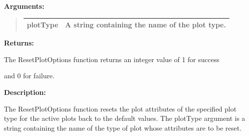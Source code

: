 \documentclass[letterpaper,10pt,english]{sphinxmanual}
\begin{document}
\begin{DUlineblock}{0em}
\item[] 
\item[] \textbf{Arguments:}
\end{DUlineblock}
\begin{quote}

\begin{tabulary}{\linewidth}{|L|L|}
\hline

plotType
 & 
A string containing the name of the plot type.
\\
\hline\end{tabulary}

\end{quote}

\begin{DUlineblock}{0em}
\item[] 
\item[] \textbf{Returns:}
\item[] The ResetPlotOptions function returns an integer value of 1 for success
\item[] and 0 for failure.
\item[] 
\item[] \textbf{Description:}
\item[] The ResetPlotOptions function resets the plot attributes of the specified
plot type for the active plots back to the default values. The plotType
argument is a string containing the name of the type of plot whose
attributes are to be reset.
\end{DUlineblock}

\begin{DUlineblock}{0em}
\item[] 
\end{DUlineblock}
\end{document}
